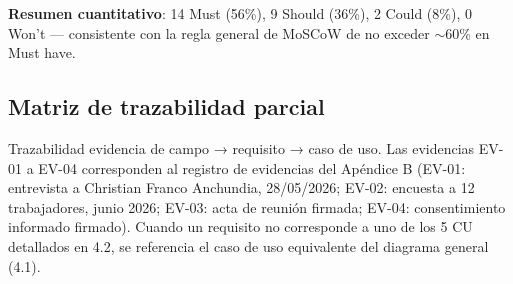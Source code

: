 \documentclass[11pt,a4paper]{article}
\begin{document}
\textbf{Resumen cuantitativo}: 14 Must (56\%), 9 Should (36\%), 2 Could (8\%), 0 Won't — consistente con la regla general de MoSCoW de no exceder $\sim$60\% en Must have.

\subsection{Matriz de trazabilidad parcial}

Trazabilidad evidencia de campo → requisito → caso de uso. Las evidencias EV-01 a EV-04 corresponden al registro de evidencias del Apéndice B (EV-01: entrevista a Christian Franco Anchundia, 28/05/2026; EV-02: encuesta a 12 trabajadores, junio 2026; EV-03: acta de reunión firmada; EV-04: consentimiento informado firmado). Cuando un requisito no corresponde a uno de los 5 CU detallados en 4.2, se referencia el caso de uso equivalente del diagrama general (4.1).
\end{document}
